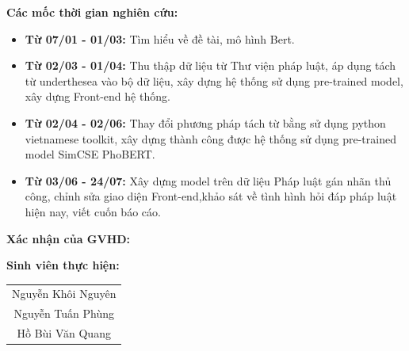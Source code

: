 	\textbf{Các mốc thời gian nghiên cứu:}\\
	\begin{itemize}
		\item[-] \textbf{Từ 07/01 - 01/03:} Tìm hiểu về đề tài, mô hình Bert.
		\item[-] \textbf{Từ  02/03 - 01/04:} Thu thập dữ liệu từ Thư viện pháp luật, áp dụng tách từ underthesea vào bộ dữ liệu, xây dựng hệ thống sử dụng pre-trained model, xây dựng Front-end hệ thống.
		\item[-] \textbf{Từ 02/04 - 02/06:} Thay đổi phương pháp tách từ bằng sử dụng python vietnamese toolkit, xây dựng thành công được hệ thống sử dụng pre-trained model SimCSE PhoBERT.
		\item[-] \textbf{Từ 03/06 - 24/07:} Xây dựng model trên dữ liệu Pháp luật gán nhãn thủ công, chỉnh sửa giao diện Front-end,khảo sát về tình hình hỏi đáp pháp luật hiện nay, viết cuốn báo cáo.
	\end{itemize}

\begin{minipage}{.45\linewidth}
	\begin{flushleft}
		\textbf{Xác nhận của GVHD: } 
	\end{flushleft}
\end{minipage}
\hfill
\begin{minipage}{.45\linewidth}
	\begin{flushright}
		\textbf{Sinh viên thực hiện:} 
	\end{flushright} 
\end{minipage}
\begin{flushright}
	\begin{tabular}{@{}c@{}}
		 \\[2.5 cm]
		
		Nguyễn Khôi Nguyên\\
		Nguyễn Tuấn Phùng\\
		Hồ Bùi Văn Quang\\
	\end{tabular}
\end{flushright}